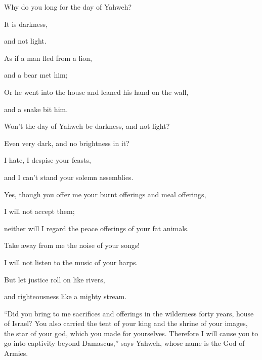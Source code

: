 {\par }{\QB Why do you long for the day of Yahweh?
\par }{\Q It is darkness,
\par }{\QB and not light.
\par }{\Q {}As if a man fled from a lion,
\par }{\QB and a bear met him;
\par }{\Q Or he went into the house and leaned his hand on the wall,
\par }{\QB and a snake bit him.
\par }{\Q {}Won’t the day of Yahweh be darkness, and not light?
\par }{\QB Even very dark, and no brightness in it?
\par }{\Q {}I hate, I despise your feasts,
\par }{\QB and I can’t stand your solemn assemblies.
\par }{\Q {}Yes, though you offer me your burnt offerings and meal offerings,
\par }{\QB I will not accept them;
\par }{\QB neither will I regard the peace offerings of your fat animals.
\par }{\Q {}Take away from me the noise of your songs!
\par }{\QB I will not listen to the music of your harps.
\par }{\Q {}But let justice roll on like rivers,
\par }{\QB and righteousness like a mighty stream.
\par }{\PP {}“Did you bring to me sacrifices and offerings in the wilderness forty years, house of Israel?
You also carried the tent of your king and the shrine of your images, the star of your god, which you made for yourselves.
Therefore I will cause you to go into captivity beyond Damascus,” says Yahweh, whose name is the God of Armies.

}
